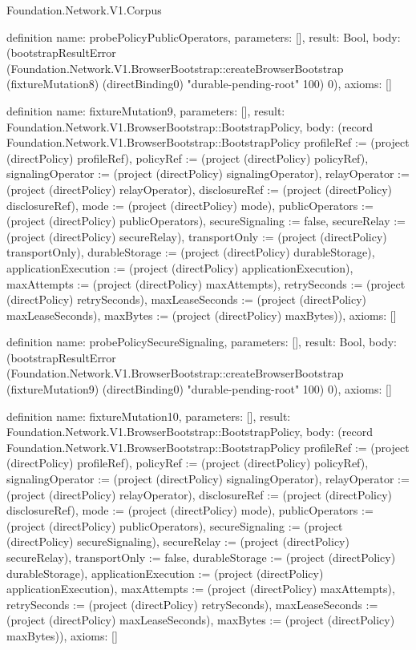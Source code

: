 \begin{lexlean}{Foundation.Network.V1.Corpus}
\begin{semanticmodule}
definition{
  name: probePolicyPublicOperators,
  parameters: [],
  result: Bool,
  body: (bootstrapResultError (Foundation.Network.V1.BrowserBootstrap::createBrowserBootstrap (fixtureMutation8) (directBinding0) "durable-pending-root" 100) 0),
  axioms: []
}

definition{
  name: fixtureMutation9,
  parameters: [],
  result: Foundation.Network.V1.BrowserBootstrap::BootstrapPolicy,
  body: (record Foundation.Network.V1.BrowserBootstrap::BootstrapPolicy {profileRef := (project (directPolicy) profileRef), policyRef := (project (directPolicy) policyRef), signalingOperator := (project (directPolicy) signalingOperator), relayOperator := (project (directPolicy) relayOperator), disclosureRef := (project (directPolicy) disclosureRef), mode := (project (directPolicy) mode), publicOperators := (project (directPolicy) publicOperators), secureSignaling := false, secureRelay := (project (directPolicy) secureRelay), transportOnly := (project (directPolicy) transportOnly), durableStorage := (project (directPolicy) durableStorage), applicationExecution := (project (directPolicy) applicationExecution), maxAttempts := (project (directPolicy) maxAttempts), retrySeconds := (project (directPolicy) retrySeconds), maxLeaseSeconds := (project (directPolicy) maxLeaseSeconds), maxBytes := (project (directPolicy) maxBytes)}),
  axioms: []
}

definition{
  name: probePolicySecureSignaling,
  parameters: [],
  result: Bool,
  body: (bootstrapResultError (Foundation.Network.V1.BrowserBootstrap::createBrowserBootstrap (fixtureMutation9) (directBinding0) "durable-pending-root" 100) 0),
  axioms: []
}

definition{
  name: fixtureMutation10,
  parameters: [],
  result: Foundation.Network.V1.BrowserBootstrap::BootstrapPolicy,
  body: (record Foundation.Network.V1.BrowserBootstrap::BootstrapPolicy {profileRef := (project (directPolicy) profileRef), policyRef := (project (directPolicy) policyRef), signalingOperator := (project (directPolicy) signalingOperator), relayOperator := (project (directPolicy) relayOperator), disclosureRef := (project (directPolicy) disclosureRef), mode := (project (directPolicy) mode), publicOperators := (project (directPolicy) publicOperators), secureSignaling := (project (directPolicy) secureSignaling), secureRelay := (project (directPolicy) secureRelay), transportOnly := false, durableStorage := (project (directPolicy) durableStorage), applicationExecution := (project (directPolicy) applicationExecution), maxAttempts := (project (directPolicy) maxAttempts), retrySeconds := (project (directPolicy) retrySeconds), maxLeaseSeconds := (project (directPolicy) maxLeaseSeconds), maxBytes := (project (directPolicy) maxBytes)}),
  axioms: []
}


\end{semanticmodule}
\end{lexlean}
